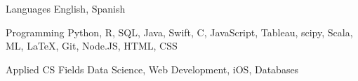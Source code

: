 

\begin{cvskills}

\cvskill
  {Languages} %
  {English, Spanish} %

  \cvskill
    {Programming} %
    {Python, R, SQL, Java, Swift, C, JavaScript, Tableau, scipy, Scala, ML, LaTeX, Git, Node.JS, HTML, CSS} %

  \cvskill
    {Applied CS Fields} %
    {Data Science, Web Development, iOS, Databases} %

\end{cvskills}

